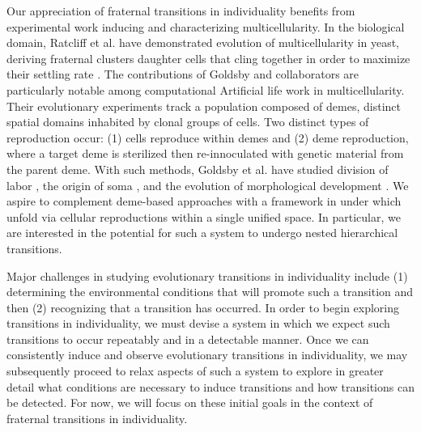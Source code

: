 Our appreciation of fraternal transitions in individuality benefits from experimental work inducing and characterizing multicellularity.
In the biological domain, Ratcliff et al. have demonstrated evolution of multicellularity in yeast, deriving fraternal clusters daughter cells that cling together in order to maximize their settling rate \cite{ratcliff2012experimental}.
The contributions of Goldsby and collaborators are particularly notable among computational Artificial life work in multicellularity.
Their evolutionary experiments track a population composed of demes, distinct spatial domains inhabited by clonal groups of cells.
Two distinct types of reproduction occur: (1) cells reproduce within demes and (2) deme reproduction, where a target deme is sterilized then re-innoculated with genetic material from the parent deme.
With such methods, Goldsby et al. have studied division of labor \cite{goldsby2010evolution, goldsby2012task}, the origin of soma \cite{goldsby2014evolutionary}, and the evolution of morphological development \cite{goldsby2017increasing}.
We aspire to complement deme-based approaches with a framework in under which unfold via cellular reproductions within a single unified space.
In particular, we are interested in the potential for such a system to undergo nested hierarchical transitions.

Major challenges in studying evolutionary transitions in individuality include (1) determining the environmental conditions that will promote such a transition and then (2) recognizing that a transition has occurred.
In order to begin exploring transitions in individuality, we must devise a system in which we expect such transitions to occur repeatably and in a detectable manner.
Once we can consistently induce and observe evolutionary transitions in individuality, we may subsequently proceed to relax aspects of such a system to explore in greater detail what conditions are necessary to induce transitions and how transitions can be detected.
For now, we will focus on these initial goals in the context of fraternal transitions in individuality.

